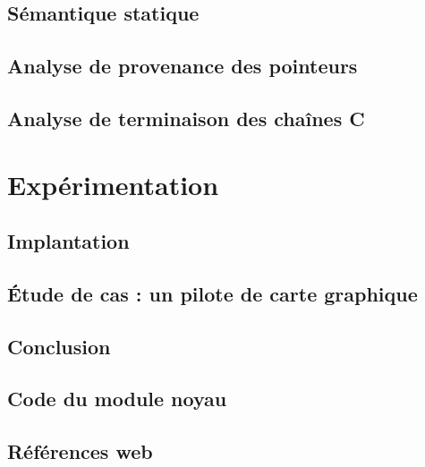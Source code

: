 \documentclass[a4paper,11pt]{memoir}
\begin{document}
\label{cha:lang}


\chapter{Sémantique statique}

\label{cha:typbase}


\chapter{Analyse de provenance des pointeurs}

\label{cha:qualuser}


\chapter{Analyse de terminaison des chaînes C}

\label{cha:qualsz}


\part{Expérimentation}

\chapter{Implantation}

\label{cha:implem}


\chapter{Étude de cas : un pilote de carte graphique}


\chapter{Conclusion}



\appendix

\chapter{Code du module noyau}

\label{cha:code-noyau}


\backmatter


\listoftodos

\clearpage

\listoffigures

\chapter{Références web}

\insertlinks



\end{document}
